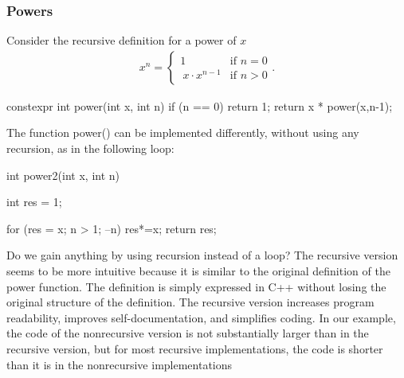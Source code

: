 \documentclass{report}
\begin{document}
    \subsubsection{Powers}
    \bigbreak \noindent 
    Consider the recursive definition for a power of $x$
    \bigbreak \noindent 
    \begin{align*}
        x^{n} = 
        \begin{cases}
            1 & \text{if } n=0 \\\
            x\cdot x^{n-1} &\text{if } n>0
        \end{cases}
    .\end{align*}
    \bigbreak \noindent 
    \begin{cppcode}
        constexpr int power(int x, int n) {
            if (n == 0) return 1;
            return x * power(x,n-1);
        }
    \end{cppcode}
    \bigbreak \noindent 
    \bigbreak \noindent 
    The function power() can be implemented differently, without using any recursion, as in the following loop:
    \bigbreak \noindent 
    \begin{cppcode}
        int power2(int x, int n) {
            int res = 1;

            for (res = x; n > 1; --n) {
                res*=x;
            }
            return res;
        }
    \end{cppcode}
    \bigbreak \noindent 
    Do we gain anything by using recursion instead of a loop? The recursive version
seems to be more intuitive because it is similar to the original definition of the power
function. The definition is simply expressed in C++ without losing the original structure of the definition. The recursive version increases program readability, improves
self-documentation, and simplifies coding. In our example, the code of the nonrecursive
version is not substantially larger than in the recursive version, but for most recursive
implementations, the code is shorter than it is in the nonrecursive implementations

    \pagebreak 
\end{document}
